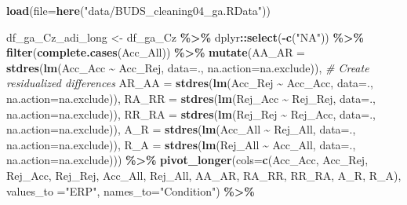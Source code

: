 \documentclass[
]{article}
\newenvironment{Shaded}{\begin{snugshade}}{\end{snugshade}}
\newcommand{\AttributeTok}[1]{\textcolor[rgb]{0.13,0.29,0.53}{#1}}
\newcommand{\CommentTok}[1]{\textcolor[rgb]{0.56,0.35,0.01}{\textit{#1}}}
\newcommand{\FunctionTok}[1]{\textcolor[rgb]{0.13,0.29,0.53}{\textbf{#1}}}
\newcommand{\NormalTok}[1]{#1}
\newcommand{\OtherTok}[1]{\textcolor[rgb]{0.56,0.35,0.01}{#1}}
\newcommand{\SpecialCharTok}[1]{\textcolor[rgb]{0.81,0.36,0.00}{\textbf{#1}}}
\newcommand{\StringTok}[1]{\textcolor[rgb]{0.31,0.60,0.02}{#1}}
\begin{document}
\begin{Shaded}
\begin{Highlighting}[]
\FunctionTok{load}\NormalTok{(}\AttributeTok{file=}\FunctionTok{here}\NormalTok{(}\StringTok{"data/BUDS\_cleaning04\_ga.RData"}\NormalTok{))}

\NormalTok{df\_ga\_Cz\_adi\_long }\OtherTok{\textless{}{-}}\NormalTok{ df\_ga\_Cz }\SpecialCharTok{\%\textgreater{}\%}
\NormalTok{  dplyr}\SpecialCharTok{::}\FunctionTok{select}\NormalTok{(}\SpecialCharTok{{-}}\FunctionTok{c}\NormalTok{(}\StringTok{"NA"}\NormalTok{)) }\SpecialCharTok{\%\textgreater{}\%}
  \FunctionTok{filter}\NormalTok{(}\FunctionTok{complete.cases}\NormalTok{(Acc\_All)) }\SpecialCharTok{\%\textgreater{}\%}
  \FunctionTok{mutate}\NormalTok{(}\AttributeTok{AA\_AR =} \FunctionTok{stdres}\NormalTok{(}\FunctionTok{lm}\NormalTok{(Acc\_Acc }\SpecialCharTok{\textasciitilde{}}\NormalTok{ Acc\_Rej, }\AttributeTok{data=}\NormalTok{., }\AttributeTok{na.action=}\NormalTok{na.exclude)), }\CommentTok{\# Create residualized differences}
         \AttributeTok{AR\_AA =} \FunctionTok{stdres}\NormalTok{(}\FunctionTok{lm}\NormalTok{(Acc\_Rej }\SpecialCharTok{\textasciitilde{}}\NormalTok{ Acc\_Acc, }\AttributeTok{data=}\NormalTok{., }\AttributeTok{na.action=}\NormalTok{na.exclude)),}
         \AttributeTok{RA\_RR =} \FunctionTok{stdres}\NormalTok{(}\FunctionTok{lm}\NormalTok{(Rej\_Acc }\SpecialCharTok{\textasciitilde{}}\NormalTok{ Rej\_Rej, }\AttributeTok{data=}\NormalTok{., }\AttributeTok{na.action=}\NormalTok{na.exclude)),}
         \AttributeTok{RR\_RA =} \FunctionTok{stdres}\NormalTok{(}\FunctionTok{lm}\NormalTok{(Rej\_Rej }\SpecialCharTok{\textasciitilde{}}\NormalTok{ Rej\_Acc, }\AttributeTok{data=}\NormalTok{., }\AttributeTok{na.action=}\NormalTok{na.exclude)),}
         \AttributeTok{A\_R =} \FunctionTok{stdres}\NormalTok{(}\FunctionTok{lm}\NormalTok{(Acc\_All }\SpecialCharTok{\textasciitilde{}}\NormalTok{ Rej\_All, }\AttributeTok{data=}\NormalTok{., }\AttributeTok{na.action=}\NormalTok{na.exclude)),}
         \AttributeTok{R\_A =} \FunctionTok{stdres}\NormalTok{(}\FunctionTok{lm}\NormalTok{(Rej\_All }\SpecialCharTok{\textasciitilde{}}\NormalTok{ Acc\_All, }\AttributeTok{data=}\NormalTok{., }\AttributeTok{na.action=}\NormalTok{na.exclude))) }\SpecialCharTok{\%\textgreater{}\%}
  \FunctionTok{pivot\_longer}\NormalTok{(}\AttributeTok{cols=}\FunctionTok{c}\NormalTok{(Acc\_Acc, Acc\_Rej, Rej\_Acc, Rej\_Rej, Acc\_All, Rej\_All, }
\NormalTok{                      AA\_AR, RA\_RR, RR\_RA, A\_R, R\_A), }\AttributeTok{values\_to =}\StringTok{"ERP"}\NormalTok{, }\AttributeTok{names\_to=}\StringTok{"Condition"}\NormalTok{) }\SpecialCharTok{\%\textgreater{}\%}

\end{Highlighting}
\end{Shaded}
\end{document}
